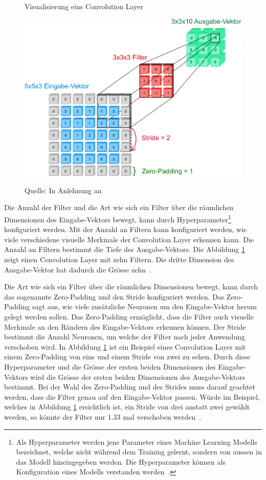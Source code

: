 \begin{figure}[h!]
    \captionsetup{width=.9\linewidth}
    \caption{Visualisierung eins Convolution Layer}
    \label{fig:conv:vis}
    \centering
    \includegraphics[scale=0.49]{graphics/cnn-visual.pdf}\\
    \vspace*{0.3cm}
    \caption*{Quelle: In Anlehnung an \textcite{CNN}}
\end{figure}

Die Anzahl der Filter und die Art wie sich ein Filter über die räumlichen Dimensionen des Eingabe-Vektors bewegt, kann durch Hyperparameter\footnote{Als Hyperparameter werden jene Parameter eines Machine Learning Modells bezeichnet, welche nicht während dem Training gelernt, sondern von aussen in das Modell hineingegeben werden. Die Hyperparameter können als Konfiguration eines Modells verstanden werden~\autocite{DesignML}.} konfiguriert werden. Mit der Anzahl an Filtern kann konfiguriert werden, wie viele verschiedene visuelle Merkmale der Convolution Layer erkennen kann. Die Anzahl an Filtern bestimmt die Tiefe des Ausgabe-Vektors. Die Abbildung \ref{fig:conv:vis} zeigt einen Convolution Layer mit zehn Filtern. Die dritte Dimension des Ausgabe-Vektor hat dadurch die Grösse zehn~\autocite{CNN}.

Die Art wie sich ein Filter über die räumlichen Dimensionen bewegt, kann durch das sogenannte Zero-Padding und den Stride konfiguriert werden. Das Zero-Padding sagt aus, wie viele zusätzliche Neuronen um den Eingabe-Vektor herum gelegt werden sollen. Das Zero-Padding ermöglicht, dass die Filter auch visuelle Merkmale an den Rändern des Eingabe-Vektors erkennen können. Der Stride bestimmt die Anzahl Neuronen, um welche der Filter nach jeder Anwendung verschoben wird. In Abbildung \ref{fig:conv:vis} ist ein Beispiel eines Convolution Layer mit einem Zero-Padding von eins und einem Stride von zwei zu sehen. Durch diese Hyperparameter und die Grösse der ersten beiden Dimensionen des Eingabe-Vektors wird die Grösse der ersten beiden Dimensionen des Ausgabe-Vektors bestimmt. Bei der Wahl des Zero-Padding und des Strides muss darauf geachtet werden, dass die Filter genau auf den Eingabe-Vektor passen. Würde im Beispiel, welches in Abbildung \ref{fig:conv:vis} ersichtlich ist, ein Stride von drei anstatt zwei gewählt werden, so könnte der Filter nur 1.33 mal verschoben werden~\autocite{CNN}.

